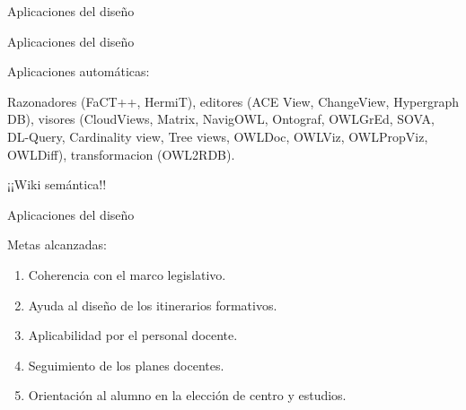 \documentclass[notes=show,19 pt]{beamer}
\begin{document}
\lstset{inputencoding=latin1}
\lstset{language=protege,basicstyle=\sffamily,columns=flexible,mathescape}
\begin{frame}[fragile]{Aplicaciones del diseño}
 	
	
\end{frame}

\begin{frame}{Aplicaciones del diseño}
\begin{LARGE}
	Aplicaciones automáticas:
	
	Razonadores (FaCT++, HermiT), editores (ACE View, ChangeView, Hypergraph DB), visores (CloudViews, Matrix, NavigOWL, Ontograf, OWLGrEd, SOVA, DL-Query, Cardinality view, Tree views, OWLDoc, OWLViz, OWLPropViz, OWLDiff), transformacion (OWL2RDB).
\end{LARGE}
	
\begin{center}
	{\Huge ¡¡Wiki semántica!!}
\end{center}
\end{frame}


\begin{frame}{Aplicaciones del diseño}
\begin{LARGE}
	Metas alcanzadas:
	\begin{enumerate}
		\item Coherencia con el marco legislativo.
		\item Ayuda al diseño de los itinerarios formativos.
		\item Aplicabilidad por el personal docente.
		\item Seguimiento de los planes docentes.
		\item Orientación al alumno en la elección de centro y estudios.
	\end{enumerate}
\end{LARGE}
\end{frame}
\end{document}
